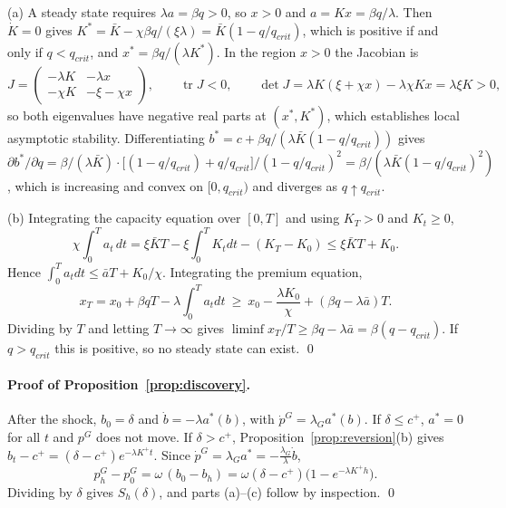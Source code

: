 \documentclass[12pt]{article}
\theoremstyle{definition}
\theoremstyle{remark}
\begin{document}
(a) A steady state requires $\lambda a=\beta q>0$, so $x>0$ and $a=K x=\beta q/\lambda$. Then $\dot K=0$ gives $K^*=\bar K-\chi\beta q/(\xi\lambda)=\bar K(1-q/q_{crit})$, which is positive if and only if $q<q_{crit}$, and $x^*=\beta q/(\lambda K^*)$. In the region $x>0$ the Jacobian is
\[
J=\begin{pmatrix}-\lambda K & -\lambda x\\ -\chi K & -\xi-\chi x\end{pmatrix},
\qquad \operatorname{tr}J<0,\qquad \det J=\lambda K(\xi+\chi x)-\lambda\chi Kx=\lambda\xi K>0,
\]
so both eigenvalues have negative real parts at $(x^*,K^*)$, which establishes local asymptotic stability. Differentiating $b^*=c+\beta q/(\lambda\bar K(1-q/q_{crit}))$ gives $\partial b^*/\partial q=\beta/(\lambda\bar K)\cdot\big[(1-q/q_{crit})+q/q_{crit}\big]/(1-q/q_{crit})^2=\beta/(\lambda\bar K(1-q/q_{crit})^2)$, which is increasing and convex on $[0,q_{crit})$ and diverges as $q\uparrow q_{crit}$.

(b) Integrating the capacity equation over $[0,T]$ and using $K_T>0$ and $K_t\ge0$,
\[
\chi\int_0^Ta_t\,dt = \xi\bar KT-\xi\int_0^TK_tdt-(K_T-K_0)\le \xi\bar KT+K_0 .
\]
Hence $\int_0^Ta_tdt\le\bar aT+K_0/\chi$. Integrating the premium equation,
\[
x_T=x_0+\beta qT-\lambda\int_0^Ta_tdt\ \ge\ x_0-\frac{\lambda K_0}{\chi}+(\beta q-\lambda\bar a)T .
\]
Dividing by $T$ and letting $T\to\infty$ gives $\liminf x_T/T\ge\beta q-\lambda\bar a=\beta(q-q_{crit})$. If $q>q_{crit}$ this is positive, so no steady state can exist. \qed

\paragraph{Proof of Proposition~\ref{prop:discovery}.}
After the shock, $b_0=\delta$ and $\dot b=-\lambda a^*(b)$, with $\dot p^G=\lambda_Ga^*(b)$. If $\delta\le c^+$, $a^*=0$ for all $t$ and $p^G$ does not move. If $\delta>c^+$, Proposition~\ref{prop:reversion}(b) gives $b_t-c^+=(\delta-c^+)e^{-\lambda K^+t}$. Since $\dot p^G=\lambda_Ga^*=-\frac{\lambda_G}{\lambda}\dot b$,
\[
p^G_h-p^G_0=\omega\,(b_0-b_h)=\omega(\delta-c^+)\big(1-e^{-\lambda K^+h}\big).
\]
Dividing by $\delta$ gives $S_h(\delta)$, and parts (a)--(c) follow by inspection. \qed
\end{document}
